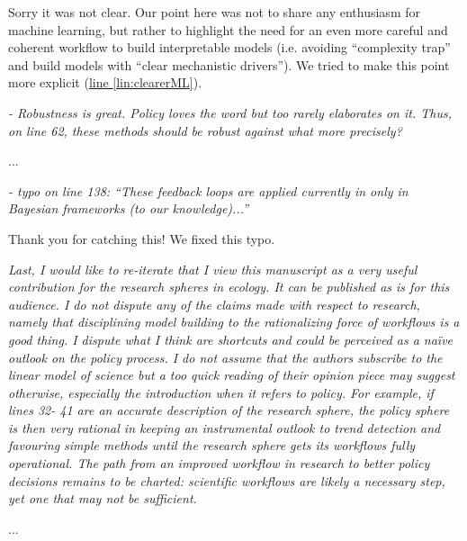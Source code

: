 \documentclass[11pt,letter]{article}
\begin{document}
Sorry it was not clear. Our point here was not to share any enthusiasm for machine learning, but rather to highlight the need for an even more careful and coherent workflow to build interpretable models (i.e. avoiding  ``complexity trap'' and build models with ``clear mechanistic drivers''). We tried to make this point more explicit  (\href{file:forecastflows_r2\#lintarget:clearerML}{line \ref*{lin:clearerML}}).

\begin{mybox}
\emph{- Robustness is great. Policy loves the word but too rarely elaborates on it. Thus, on line 62,
these methods should be robust against what more precisely?}  
\end{mybox}

...

\begin{mybox}
\emph{- typo on line 138: “These feedback loops are applied currently in only in Bayesian
frameworks (to our knowledge)...”}
\end{mybox}

Thank you for catching this! We fixed this typo.

\begin{mybox}
\emph{Last, I would like to re-iterate that I view this manuscript as a very useful contribution for the
research spheres in ecology. It can be published as is for this audience. I do not dispute any of
the claims made with respect to research, namely that disciplining model building to the
rationalizing force of workflows is a good thing. I dispute what I think are shortcuts and could
be perceived as a naïve outlook on the policy process. I do not assume that the authors
subscribe to the linear model of science but a too quick reading of their opinion piece may
suggest otherwise, especially the introduction when it refers to policy. For example, if lines 32-
41 are an accurate description of the research sphere, the policy sphere is then very rational in
keeping an instrumental outlook to trend detection and favouring simple methods until the
research sphere gets its workflows fully operational. The path from an improved workflow in
research to better policy decisions remains to be charted: scientific workflows are likely a
necessary step, yet one that may not be sufficient.}
\end{mybox}

...
\end{document}

